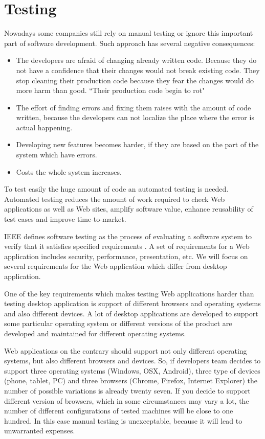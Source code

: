\section{Testing}
		Nowadays some companies still rely on manual testing or ignore this
		important part of software development. Such approach has several
		negative consequences:
		\begin{itemize}
			\item The developers are afraid of changing already written
			code. Because they do not have a confidence that their changes would not 
			break existing code. They stop cleaning their production code because they
			fear the changes would do more harm than good. ``Their production code begin
			to rot"
			\cite[p.123]{cleancode} 
			
			\item The effort of finding errors and	fixing them raises with the amount of
			code written, because the developers can not localize the place where the
			error is actual happening.
			\item Developing new features becomes harder, if they are based on the part
			of the system which have errors.
		
			\item Costs the whole system increases.
	 	 \end{itemize}
	 	 
	 	 To test easily the huge amount of code an automated testing is needed.	
	 	 Automated testing reduces the amount of work required to check Web applications as
	 	 well as Web sites, amplify software value, enhance reusability of test cases and improve time-to-market.
	   
		IEEE defines software testing as the process of evaluating a software
		system to verify that it satisfies specified requirements \cite{Xu1}. A set of
		requirements for a Web application includes security, performance,
		presentation, etc. We will focus on several requirements for the Web
		application which differ from desktop application. 
		
		One of the key requirements which makes testing Web applications harder than
		testing desktop application is support of different browsers and operating systems and also
		different devices. A lot of desktop applications are developed to support some
		particular operating system or different versions of the product are developed
		and maintained for different operating systems. 
		
		Web applications on the	contrary should support not only different operating systems, but also
		different browsers and devices. So, if developers team decides to support
		three operating systems (Windows, OSX, Android), three type of devices (phone,
		tablet, PC) and three browsers (Chrome, Firefox, Internet Explorer) the number
		of possible variations is already twenty seven. If you decide to support
		different version of browsers, which in some circumstances may vary a lot,
		the number of different configurations of tested machines will be close to
		one hundred. In this case manual testing is unexceptable, because it will lead
		to unwarranted expenses. 
		

